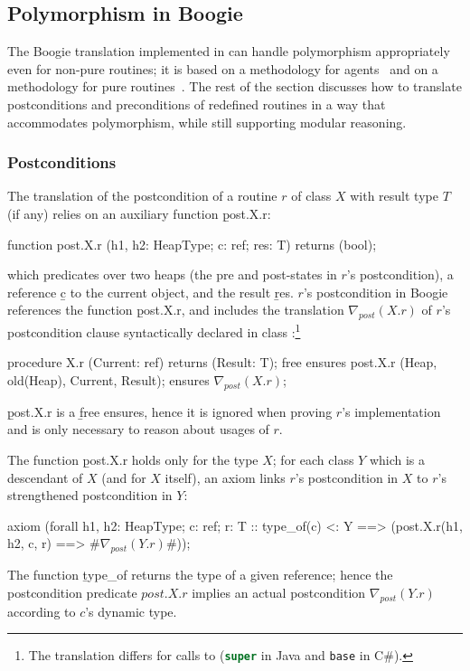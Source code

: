 \subsection{Polymorphism in Boogie}

The Boogie translation implemented in \AutoProof can handle polymorphism appropriately even for non-pure routines; it is based
on a methodology for agents~\cite{NORDIO10} and on a methodology for pure routines~\cite{DARVAS07,LEINO08b}.
The rest of the section discusses how to translate postconditions and preconditions of redefined routines in a way that accommodates polymorphism, while still supporting modular reasoning.


\subsubsection{Postconditions}

The translation of the postcondition of a routine $r$ of class $X$ with result type $T$ (if any) relies on an auxiliary function \b{post.X.r}:
\begin{brunning}
function post.X.r (h1, h2: HeapType; c: ref; res: T) returns (bool);
\end{brunning}
which predicates over two heaps (the pre and post-states in $r$'s postcondition), a reference \b{c} to the current object, and the result \b{res}.
$r$'s postcondition in Boogie references the function \b{post.X.r}, and includes the translation $\nabla_{post}(X.r)$ of $r$'s postcondition clause syntactically declared in class :\footnote{The translation differs for calls to  (\lstinline[language=Java]|super| in Java and \lstinline[language={[Sharp]C}]|base| in C\#).}
\begin{brunning}
procedure X.r (Current: ref) returns (Result: T);
  free ensures post.X.r (Heap, old(Heap), Current, Result);
  ensures $\nabla_{post}(X.r)$;
\end{brunning}
\b{post.X.r} is a \b{free ensures}, hence it is ignored when proving $r$'s implementation and is only necessary to reason about usages of $r$.

The function \b{post.X.r} holds only for the type $X$; for each class $Y$ which is a descendant of $X$ (and for $X$ itself), an axiom links $r$'s postcondition in $X$ to $r$'s strengthened postcondition in $Y$:
\begin{brunning}
axiom (forall h1, h2: HeapType; c: ref; r: T ::
    type_of(c) <: Y ==> (post.X.r(h1, h2, c, r) ==> #$\nabla_{post}(Y.r)$#));
\end{brunning}
The function \b{type_of} returns the type of a given reference; hence the postcondition predicate $post.X.r$ implies an actual postcondition $\nabla_{post}(Y.r)$ according to $c$'s dynamic type. 

